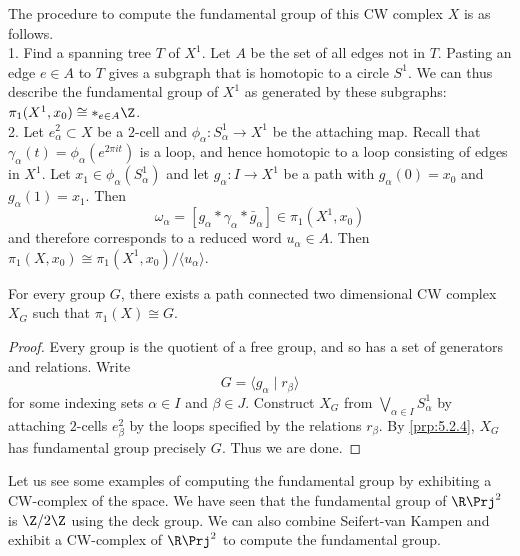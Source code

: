 \documentclass[a4paper]{article}
\begin{document}
The procedure to compute the fundamental group of this CW complex $X$ is as follows. \\
1. Find a spanning tree $T$ of $X^1$. Let $A$ be the set of all edges not in $T$. Pasting an edge $e\in A$ to $T$ gives a subgraph that is homotopic to a circle $S^1$. We can thus describe the fundamental group of $X^1$ as generated by these subgraphs: $\pi_1(X^1,x_0)\cong\ast_{e\in A}\Z$. \\
2. Let $e_\alpha^2\subset X$ be a $2$-cell and $\phi_\alpha:S_\alpha^1\to X^1$ be the attaching map. Recall that $\gamma_\alpha(t)=\phi_\alpha(e^{2\pi it})$ is a loop, and hence homotopic to a loop consisting of edges in $X^1$. Let $x_1\in\phi_\alpha(S_\alpha^1)$ and let $g_\alpha:I\to X^1$ be a path with $g_\alpha(0)=x_0$ and $g_\alpha(1)=x_1$. Then $$\omega_\alpha=[g_\alpha\ast\gamma_\alpha\ast\bar{g}_\alpha]\in\pi_1(X^1,x_0)$$ and therefore corresponds to a reduced word $u_\alpha\in A$. Then $\pi_1(X,x_0)\cong\pi_1(X^1,x_0)/\langle u_\alpha\rangle$. 

\begin{thm}{}{} For every group $G$, there exists a path connected two dimensional CW complex $X_G$ such that $\pi_1(X)\cong G$. 
\begin{proof}
Every group is the quotient of a free group, and so has a set of generators and relations. Write $$G=\langle g_\alpha\;|\;r_\beta\rangle$$ for some indexing sets $\alpha\in I$ and $\beta\in J$. Construct $X_G$ from $\bigvee_{\alpha\in I}S_\alpha^1$ by attaching $2$-cells $e_\beta^2$ by the loops specified by the relations $r_\beta$. By \ref{prp:5.2.4}, $X_G$ has fundamental group precisely $G$. Thus we are done. 
\end{proof}
\end{thm}

Let us see some examples of computing the fundamental group by exhibiting a CW-complex of the space. We have seen that the fundamental group of $\R\Prj^2$ is $\Z/2\Z$ using the deck group. We can also combine Seifert-van Kampen and exhibit a CW-complex of $\R\Prj^2$ to compute the fundamental group. 
\end{document}

